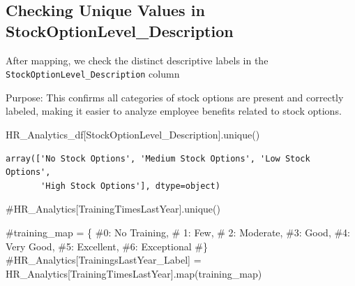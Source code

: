 \documentclass[
  letterpaper,
  DIV=11,
  numbers=noendperiod]{scrartcl}
\newenvironment{Shaded}{\begin{snugshade}}{\end{snugshade}}
\newcommand{\CommentTok}[1]{\textcolor[rgb]{0.37,0.37,0.37}{#1}}
\newcommand{\NormalTok}[1]{\textcolor[rgb]{0.00,0.23,0.31}{#1}}
\newcommand{\StringTok}[1]{\textcolor[rgb]{0.13,0.47,0.30}{#1}}
\begin{document}
\subsection{Checking Unique Values in
StockOptionLevel\_Description}\label{checking-unique-values-in-stockoptionlevel_description}

After mapping, we check the distinct descriptive labels in the
\texttt{StockOptionLevel\_Description} column

Purpose: This confirms all categories of stock options are present and
correctly labeled, making it easier to analyze employee benefits related
to stock options.

\begin{Shaded}
\begin{Highlighting}[]
\NormalTok{HR\_Analytics\_df[}\StringTok{\textquotesingle{}StockOptionLevel\_Description\textquotesingle{}}\NormalTok{].unique()}
\end{Highlighting}
\end{Shaded}

\begin{verbatim}
array(['No Stock Options', 'Medium Stock Options', 'Low Stock Options',
       'High Stock Options'], dtype=object)
\end{verbatim}

\begin{Shaded}
\begin{Highlighting}[]
\CommentTok{\#HR\_Analytics[\textquotesingle{}TrainingTimesLastYear\textquotesingle{}].unique()}
\end{Highlighting}
\end{Shaded}

\begin{Shaded}
\begin{Highlighting}[]
\CommentTok{\#training\_map = \{}
 \CommentTok{\#0: \textquotesingle{}No Training\textquotesingle{},}
  \CommentTok{\#  1: \textquotesingle{}Few\textquotesingle{},}
   \CommentTok{\# 2: \textquotesingle{}Moderate\textquotesingle{},}
    \CommentTok{\#3: \textquotesingle{}Good\textquotesingle{},}
    \CommentTok{\#4: \textquotesingle{}Very Good\textquotesingle{},}
    \CommentTok{\#5: \textquotesingle{}Excellent\textquotesingle{},}
    \CommentTok{\#6: \textquotesingle{}Exceptional\textquotesingle{}}
\CommentTok{\#\}}
\CommentTok{\#HR\_Analytics[\textquotesingle{}TrainingsLastYear\_Label\textquotesingle{}] = HR\_Analytics[\textquotesingle{}TrainingTimesLastYear\textquotesingle{}].map(training\_map)}
\end{Highlighting}
\end{Shaded}
\end{document}
